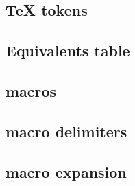     \subsection{\TeX{} tokens}
    \label{sec:tutorial/texnician/token}
    
    
    \subsection{Equivalents table}
    \label{sec:tutorial/texnician/equiv}
    
    
    \subsection*{\thesubsection\hspace{1em}\Glspl{macro}}
    \label{sec:tutorial/texnician/macro}
    
    
    \subsection*{\thesubsection\hspace{1em}\Gls{macro} delimiters}
    \label{sec:tutorial/texnician/macro-delim}
    
    
    \subsection*{\thesubsection\hspace{1em}\Gls{macro} expansion}
    \label{sec:tutorial/texnician/macro-exp}
    
    

